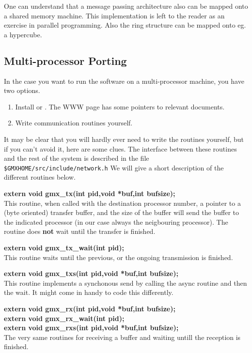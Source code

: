 One can understand that a message passing architecture also can be
mapped onto a shared memory machine. This implementation is left to
the reader as an exercise in parallel programming. Also the ring
structure can be mapped onto eg. a hypercube.

\subsection{Multi-processor Porting}

In the case you want to run the {\gromacs} software on a
multi-processor machine, you have two options.
\begin{enumerate}
\item	Install  or . The {\gromacs} WWW
	page has some pointers to relevant documents.
\item	Write communication routines yourself. 
\end{enumerate}

It may be clear that you will hardly ever need to write the routines
yourself, but if you can't avoid it, here are some clues.
The interface between these routines and the
rest of the {\gromacs} system is described in the file {\tt
\$GMXHOME/src/include/network.h} We will give a short description of the
different routines below.

{\bf extern void gmx\_tx(int pid,void *buf,int bufsize);}\\ 

This routine, when called with the destination processor number, a
pointer to a (byte oriented) transfer buffer, and the size of the
buffer will send the buffer to the indicated processor (in our case
always the neigbouring processor). The routine does {\bf not} wait
until the transfer is finished.

\smallskip

{\bf extern void gmx\_tx\_wait(int pid);}\\
This routine waits until the previous, or the ongoing transmission is finished.

\smallskip


{\bf extern void gmx\_txs(int pid,void *buf,int bufsize);}\\
This routine implements a synchonous send by calling the async routine and then
the wait. It might come in handy to code this differently.

\smallskip

{\bf extern void gmx\_rx(int pid,void *buf,int bufsize);}\\
{\bf extern void gmx\_rx\_wait(int pid);}\\
{\bf extern void gmx\_rxs(int pid,void *buf,int bufsize);}\\
The very same routines for receiving a buffer and waiting untill the reception is finished.

